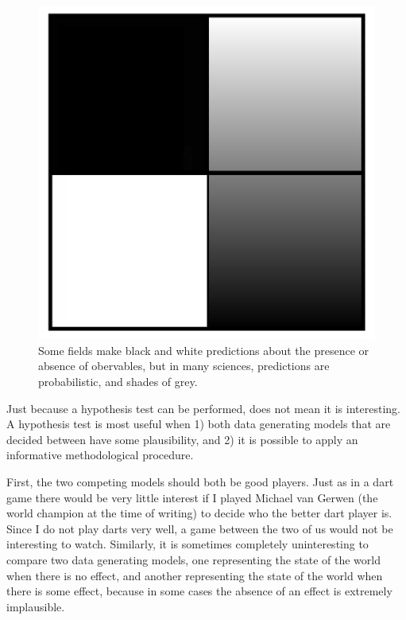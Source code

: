 \documentclass[
  oneside]{book}
\begin{document}
\begin{figure}

{\centering \includegraphics[width=1\linewidth]{images/blackwhite} 

}

\caption{Some fields make black and white predictions about the presence or absence of obervables, but in many sciences, predictions are probabilistic, and shades of grey.}\label{fig:blackwhite}
\end{figure}

Just because a hypothesis test can be performed, does not mean it is interesting. A hypothesis test is most useful when 1) both data generating models that are decided between have some plausibility, and 2) it is possible to apply an informative methodological procedure.

First, the two competing models should both be good players. Just as in a dart game there would be very little interest if I played Michael van Gerwen (the world champion at the time of writing) to decide who the better dart player is. Since I do not play darts very well, a game between the two of us would not be interesting to watch. Similarly, it is sometimes completely uninteresting to compare two data generating models, one representing the state of the world when there is no effect, and another representing the state of the world when there is some effect, because in some cases the absence of an effect is extremely implausible.
\end{document}
